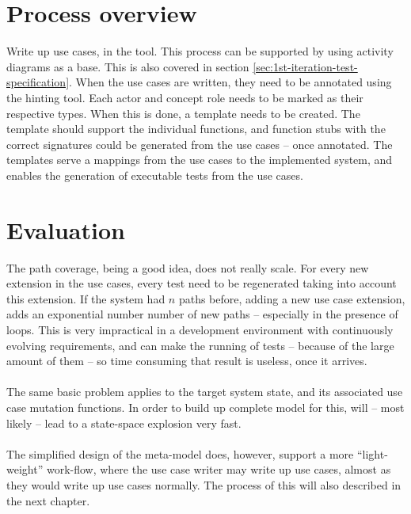 \section{Process overview}
Write up use cases, in the tool. This process can be supported by using activity diagrams as a base. This is also covered in section \ref{sec:1st-iteration-test-specification}.
When the use cases are written, they need to be annotated using the hinting tool. Each actor and concept role needs to be marked as their respective types.
When this is done, a template needs to be created. The template should support the individual functions, and function stubs with the correct signatures could be generated from the use cases -- once annotated.
The templates serve a mappings from the use cases to the implemented system, and enables the generation of executable tests from the use cases.

\section{Evaluation}
The path coverage, being a good idea, does not really scale. For every new extension in the use cases, every test need to be regenerated taking into account this extension. If the system had $n$ paths before, adding a new use case extension, adds an exponential number number of new paths -- especially in the presence of loops. This is very impractical in a development environment with continuously evolving requirements, and can make the running of tests -- because of the large amount of them -- so time consuming that result is useless, once it arrives.\\\\
The same basic problem applies to the target system state, and its associated use case mutation functions. In order to build up complete model for this, will -- most likely -- lead to a state-space explosion very fast.\\\\
The simplified design of the meta-model does, however, support a more ``light-weight'' work-flow, where the use case writer may write up use cases, almost as they would write up use cases normally. The process of this will also described in the next chapter.